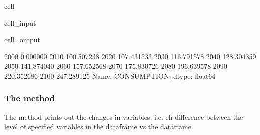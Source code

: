 \documentclass[letterpaper,10pt,english]{jupyterBook}
\begin{document}
\begin{sphinxuseclass}{cell}\begin{sphinxVerbatimInput}

\begin{sphinxuseclass}{cell_input}
\begin{sphinxVerbatim}[commandchars=\\\{\}]
\PYG{p}{[}\PYG{p}{]}
\end{sphinxVerbatim}

\end{sphinxuseclass}\end{sphinxVerbatimInput}
\begin{sphinxVerbatimOutput}

\begin{sphinxuseclass}{cell_output}
\begin{sphinxVerbatim}[commandchars=\\\{\}]
2000      0.000000
2010    100.507238
2020    107.431233
2030    116.791578
2040    128.304359
2050    141.874040
2060    157.652568
2070    175.830726
2080    196.639578
2090    220.352686
2100    247.289125
Name: CONSUMPTION, dtype: float64
\end{sphinxVerbatim}

\end{sphinxuseclass}\end{sphinxVerbatimOutput}

\end{sphinxuseclass}

\subsubsection{The  method}
\label{\detokenize{content/03_Installation/TestingModelFlow:the-dif-df-method}}
\sphinxAtStartPar
The  method prints out the changes in variables, i.e. eh difference between the level of specified  variables in the  dataframe vs the  dataframe.
\end{document}
